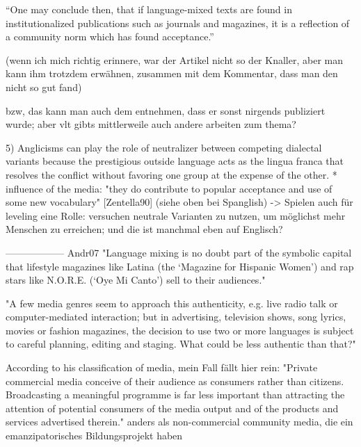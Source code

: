 ``One may conclude then, that if language-mixed
texts are found in institutionalized publications such as journals and magazines, it is a
reflection of a community norm which has found acceptance.''


(wenn ich mich richtig erinnere, war der Artikel nicht so der Knaller, aber man kann ihm trotzdem erwähnen, zusammen mit dem Kommentar, dass man den nicht so gut fand)

bzw, das kann man auch dem entnehmen, dass er sonst nirgends publiziert wurde;
aber vlt gibts mittlerweile auch andere arbeiten zum thema?


       5) Anglicisms can play the role of neutralizer between competing dialectal variants because the
       prestigious outside language acts as the lingua franca that resolves the conflict without favoring one
       group at the expense of the other.
      * influence of the media: "they do contribute to popular acceptance and use of some new vocabulary" [Zentella90]
        (siehe oben bei Spanglish)
        -> Spielen auch für leveling eine Rolle: versuchen neutrale Varianten zu nutzen, um möglichst mehr Menschen zu erreichen; und die ist manchmal eben auf Englisch?

------------------
{Andr07}
"Language mixing is no doubt part of the symbolic capital that
  lifestyle magazines like Latina (the ‘Magazine for Hispanic Women’) and rap
  stars like N.O.R.E. (‘Oye Mi Canto’) sell to their audiences."

"A few media genres seem to approach this
  authenticity, e.g. live radio talk or computer-mediated interaction; but in
  advertising, television shows, song lyrics, movies or fashion magazines, the
  decision to use two or more languages is subject to careful planning, editing
  and staging. What could be less authentic than that?"

According to his classification of media, mein Fall fällt hier rein:
"Private commercial media conceive of their
  audience as consumers rather than citizens. Broadcasting a meaningful
  programme is far less important than attracting the attention of potential
  consumers of the media output and of the products and services advertised
  therein."
anders als non-commercial community media, die ein emanzipatorisches Bildungsprojekt haben

